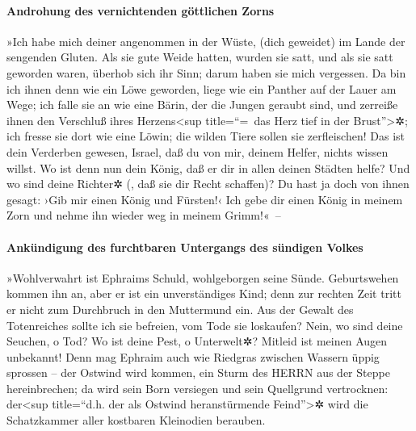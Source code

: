 \hypertarget{androhung-des-vernichtenden-guxf6ttlichen-zorns}{%
\paragraph{Androhung des vernichtenden göttlichen
Zorns}\label{androhung-des-vernichtenden-guxf6ttlichen-zorns}}

 »Ich habe mich deiner angenommen in der Wüste, (dich
geweidet) im Lande der sengenden Gluten.  Als sie gute
Weide hatten, wurden sie satt, und als sie satt geworden waren, überhob
sich ihr Sinn; darum haben sie mich vergessen.  Da bin ich
ihnen denn wie ein Löwe geworden, liege wie ein Panther auf der Lauer am
Wege;  ich falle sie an wie eine Bärin, der die Jungen
geraubt sind, und zerreiße ihnen den Verschluß ihres
Herzens\textless sup title=``=~das Herz tief in der
Brust''\textgreater✲; ich fresse sie dort wie eine Löwin; die wilden
Tiere sollen sie zerfleischen!  Das ist dein Verderben
gewesen, Israel, daß du von mir, deinem Helfer, nichts wissen willst.
 Wo ist denn nun dein König, daß er dir in allen deinen
Städten helfe? Und wo sind deine Richter✲ (, daß sie dir Recht
schaffen)? Du hast ja doch von ihnen gesagt: ›Gib mir einen König und
Fürsten!‹  Ich gebe dir einen König in meinem Zorn und
nehme ihn wieder weg in meinem Grimm!«~--

\hypertarget{ankuxfcndigung-des-furchtbaren-untergangs-des-suxfcndigen-volkes}{%
\paragraph{Ankündigung des furchtbaren Untergangs des sündigen
Volkes}\label{ankuxfcndigung-des-furchtbaren-untergangs-des-suxfcndigen-volkes}}

 »Wohlverwahrt ist Ephraims Schuld, wohlgeborgen seine
Sünde.  Geburtswehen kommen ihn an, aber er ist ein
unverständiges Kind; denn zur rechten Zeit tritt er nicht zum Durchbruch
in den Muttermund ein.  Aus der Gewalt des Totenreiches
sollte ich sie befreien, vom Tode sie loskaufen? Nein, wo sind deine
Seuchen, o Tod? Wo ist deine Pest, o Unterwelt✲? Mitleid ist meinen
Augen unbekannt!  Denn mag Ephraim auch wie Riedgras
zwischen Wassern üppig sprossen -- der Ostwind wird kommen, ein Sturm
des HERRN aus der Steppe hereinbrechen; da wird sein Born versiegen und
sein Quellgrund vertrocknen: der\textless sup title=``d.h. der als
Ostwind heranstürmende Feind''\textgreater✲ wird die Schatzkammer aller
kostbaren Kleinodien berauben.

